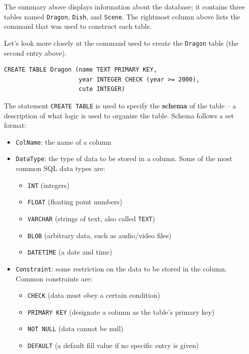 \documentclass[
  letterpaper,
  DIV=11,
  numbers=noendperiod]{scrreprt}
\providecommand{\tightlist}{%
  \setlength{\itemsep}{0pt}\setlength{\parskip}{0pt}}\usepackage{longtable,booktabs,array}
\begin{document}
The summary above displays information about the database; it contains
three tables named \texttt{Dragon}, \texttt{Dish}, and \texttt{Scene}.
The rightmost column above lists the command that was used to construct
each table.

Let's look more closely at the command used to create the
\texttt{Dragon} table (the second entry above).

\begin{verbatim}
CREATE TABLE Dragon (name TEXT PRIMARY KEY,
                     year INTEGER CHECK (year >= 2000),
                     cute INTEGER)
\end{verbatim}

The statement \texttt{CREATE\ TABLE} is used to specify the
\textbf{schema} of the table -- a description of what logic is used to
organize the table. Schema follows a set format:

\begin{itemize}
\item
  \texttt{ColName}: the name of a column
\item
  \texttt{DataType}: the type of data to be stored in a column. Some of
  the most common SQL data types are:

  \begin{itemize}
  \tightlist
  \item
    \texttt{INT} (integers)
  \item
    \texttt{FLOAT} (floating point numbers)
  \item
    \texttt{VARCHAR} (strings of text, also called \texttt{TEXT})
  \item
    \texttt{BLOB} (arbitrary data, such as audio/video files)
  \item
    \texttt{DATETIME} (a date and time)
  \end{itemize}
\item
  \texttt{Constraint}: some restriction on the data to be stored in the
  column. Common constraints are:

  \begin{itemize}
  \tightlist
  \item
    \texttt{CHECK} (data must obey a certain condition)
  \item
    \texttt{PRIMARY\ KEY} (designate a column as the table's primary
    key)
  \item
    \texttt{NOT\ NULL} (data cannot be null)
  \item
    \texttt{DEFAULT} (a default fill value if no specific entry is
    given)
  \end{itemize}
\end{itemize}
\end{document}
